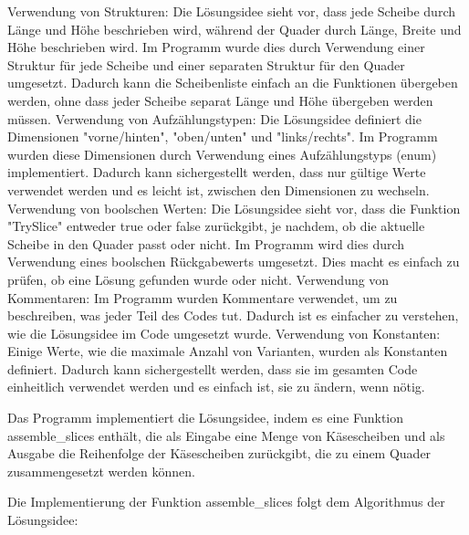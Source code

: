 \documentclass[a4paper,10pt,ngerman]{scrartcl}
\begin{document}
    Verwendung von Strukturen: Die Lösungsidee sieht vor, dass jede Scheibe durch Länge und Höhe beschrieben wird, während der Quader durch Länge, Breite und Höhe beschrieben wird.
    Im Programm wurde dies durch Verwendung einer Struktur für jede Scheibe und einer separaten Struktur für den Quader umgesetzt.
    Dadurch kann die Scheibenliste einfach an die Funktionen übergeben werden, ohne dass jeder Scheibe separat Länge und Höhe übergeben werden müssen.
    Verwendung von Aufzählungstypen: Die Lösungsidee definiert die Dimensionen "vorne/hinten", "oben/unten" und "links/rechts".
    Im Programm wurden diese Dimensionen durch Verwendung eines Aufzählungstyps (enum) implementiert.
    Dadurch kann sichergestellt werden, dass nur gültige Werte verwendet werden und es leicht ist, zwischen den Dimensionen zu wechseln.
    Verwendung von boolschen Werten: Die Lösungsidee sieht vor, dass die Funktion "TrySlice" entweder true oder false zurückgibt, je nachdem, ob die aktuelle Scheibe in den Quader passt oder nicht.
    Im Programm wird dies durch Verwendung eines boolschen Rückgabewerts umgesetzt.
    Dies macht es einfach zu prüfen, ob eine Lösung gefunden wurde oder nicht.
    Verwendung von Kommentaren: Im Programm wurden Kommentare verwendet, um zu beschreiben, was jeder Teil des Codes tut.
    Dadurch ist es einfacher zu verstehen, wie die Lösungsidee im Code umgesetzt wurde.
    Verwendung von Konstanten: Einige Werte, wie die maximale Anzahl von Varianten, wurden als Konstanten definiert.
    Dadurch kann sichergestellt werden, dass sie im gesamten Code einheitlich verwendet werden und es einfach ist, sie zu ändern, wenn nötig.

    Das Programm implementiert die Lösungsidee, indem es eine Funktion assemble_slices enthält, die als Eingabe eine Menge von Käsescheiben und als Ausgabe die Reihenfolge der Käsescheiben zurückgibt, die zu einem Quader zusammengesetzt werden können.

    Die Implementierung der Funktion assemble_slices folgt dem Algorithmus der Lösungsidee:
\end{document}

